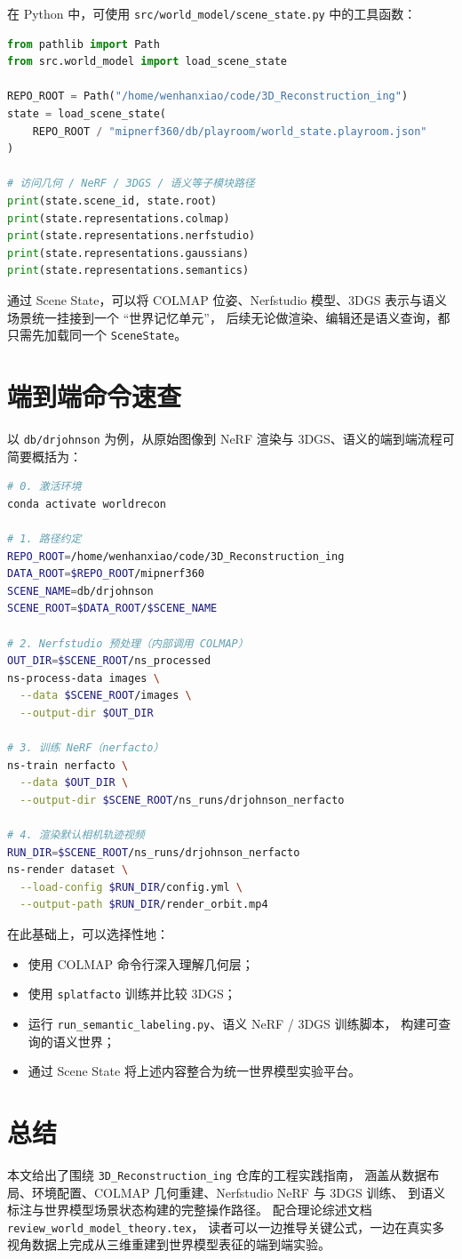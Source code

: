 \documentclass[12pt]{ctexart}
\begin{document}
在 Python 中，可使用 \texttt{src/world\_model/scene\_state.py} 中的工具函数：
\begin{lstlisting}[language=python]
from pathlib import Path
from src.world_model import load_scene_state

REPO_ROOT = Path("/home/wenhanxiao/code/3D_Reconstruction_ing")
state = load_scene_state(
    REPO_ROOT / "mipnerf360/db/playroom/world_state.playroom.json"
)

# 访问几何 / NeRF / 3DGS / 语义等子模块路径
print(state.scene_id, state.root)
print(state.representations.colmap)
print(state.representations.nerfstudio)
print(state.representations.gaussians)
print(state.representations.semantics)
\end{lstlisting}

通过 Scene State，可以将 COLMAP 位姿、Nerfstudio 模型、3DGS 表示与语义场景统一挂接到一个 ``世界记忆单元''，
后续无论做渲染、编辑还是语义查询，都只需先加载同一个 \texttt{SceneState}。

\section{端到端命令速查}

以 \texttt{db/drjohnson} 为例，从原始图像到 NeRF 渲染与 3DGS、语义的端到端流程可简要概括为：
\begin{lstlisting}[language=bash]
# 0. 激活环境
conda activate worldrecon

# 1. 路径约定
REPO_ROOT=/home/wenhanxiao/code/3D_Reconstruction_ing
DATA_ROOT=$REPO_ROOT/mipnerf360
SCENE_NAME=db/drjohnson
SCENE_ROOT=$DATA_ROOT/$SCENE_NAME

# 2. Nerfstudio 预处理（内部调用 COLMAP）
OUT_DIR=$SCENE_ROOT/ns_processed
ns-process-data images \
  --data $SCENE_ROOT/images \
  --output-dir $OUT_DIR

# 3. 训练 NeRF（nerfacto）
ns-train nerfacto \
  --data $OUT_DIR \
  --output-dir $SCENE_ROOT/ns_runs/drjohnson_nerfacto

# 4. 渲染默认相机轨迹视频
RUN_DIR=$SCENE_ROOT/ns_runs/drjohnson_nerfacto
ns-render dataset \
  --load-config $RUN_DIR/config.yml \
  --output-path $RUN_DIR/render_orbit.mp4
\end{lstlisting}

在此基础上，可以选择性地：
\begin{itemize}
  \item 使用 COLMAP 命令行深入理解几何层；
  \item 使用 \texttt{splatfacto} 训练并比较 3DGS；
  \item 运行 \texttt{run\_semantic\_labeling.py}、语义 NeRF / 3DGS 训练脚本，
        构建可查询的语义世界；
  \item 通过 Scene State 将上述内容整合为统一世界模型实验平台。
\end{itemize}

\section{总结}

本文给出了围绕 \texttt{3D\_Reconstruction\_ing} 仓库的工程实践指南，
涵盖从数据布局、环境配置、COLMAP 几何重建、Nerfstudio NeRF 与 3DGS 训练、
到语义标注与世界模型场景状态构建的完整操作路径。
配合理论综述文档 \texttt{review\_world\_model\_theory.tex}，
读者可以一边推导关键公式，一边在真实多视角数据上完成从三维重建到世界模型表征的端到端实验。
\end{document}
